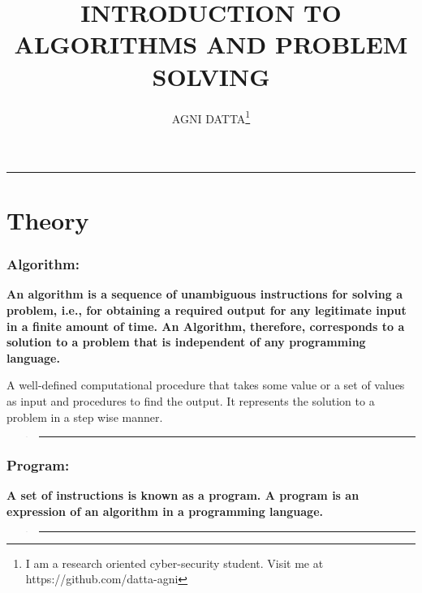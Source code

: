 \documentclass[british]{article}
\begin{document}
\title{\textbf{\huge{}INTRODUCTION TO ALGORITHMS AND PROBLEM SOLVING}}
\author{AGNI DATTA\thanks{I am a research oriented cyber-security student. Visit me at https://github.com/datta-agni}}
\maketitle
\begin{center}
\rule[0.5ex]{0.5\columnwidth}{0.5pt}
\par\end{center}

\vfill{}

\pagebreak{}

\tableofcontents{}

\vfill{}

\pagebreak{}

\part{Theory}

\section{Algorithm:}

\textbf{An algorithm is a sequence of unambiguous instructions for
solving a problem, i.e., for obtaining a required output for any legitimate
input in a finite amount of time. An Algorithm, therefore, corresponds
to a solution to a problem that is independent of any programming
language.}

A well-defined computational procedure that takes some value or a
set of values as input and procedures to find the output. It represents
the solution to a problem in a step wise manner.
\begin{verse}
\rule[0.5ex]{1\columnwidth}{1pt} 
\end{verse}

\section{Program:}

\textbf{A set of instructions is known as a program. A program is
an expression of an algorithm in a programming language.}
\begin{verse}
\rule[0.5ex]{1\columnwidth}{1pt} 
\end{verse}
\end{document}
